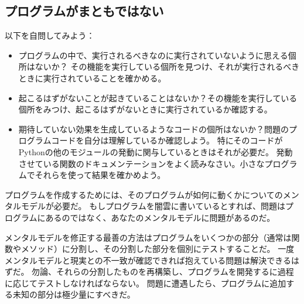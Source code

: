 \documentclass[a4j,12pt,makeidx]{jbook}
\begin{document}
\subsection*{プログラムがまともではない}
以下を自問してみよう：
\begin{itemize}
\item プログラムの中で、実行されるべきなのに実行されていないように思える個所はないか？
その機能を実行している個所を見つけ、それが実行されるべきときに実行されていることを確かめる。
\item 起こるはずがないことが起きていることはないか？その機能を実行している個所をみつけ、起こるはずがないときに実行されているか確認する。
\item 期待していない効果を生成しているようなコードの個所はないか？問題のプログラムコードを自分は理解しているか確認しよう。
特にそのコードがPythonの他のモジュールの発動に関与しているときはそれが必要だ。
発動させている関数のドキュメンテーションをよく読みなさい。小さなプログラムでそれらを使って結果を確かめよう。
\end{itemize} \par
プログラムを作成するためには、そのプログラムが如何に動くかについてのメンタルモデルが必要だ。
もしプログラムを闇雲に書いているとすれば、問題はプログラムにあるのではなく、あなたのメンタルモデルに問題があるのだ。\par
メンタルモデルを修正する最善の方法はプログラムをいくつかの部分（通常は関数やメソッド）に分割し、その分割した部分を個別にテストすることだ。
一度メンタルモデルと現実との不一致が確認できれば抱えている問題は解決できるはずだ。
勿論、それらの分割したものを再構築し、プログラムを開発するに過程に応じてテストしなければならない。
問題に遭遇したら、プログラムに追加する未知の部分は極少量にすべきだ。
\end{document}
